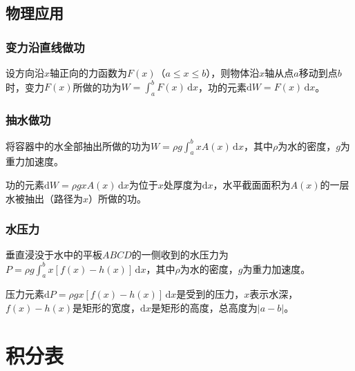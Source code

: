 \documentclass[UTF8, 12pt]{ctexart}
\begin{document}
\subsection{物理应用}

\subsubsection{变力沿直线做功}

设方向沿$x$轴正向的力函数为$F(x)$（$a\leqslant x\leqslant b$），则物体沿$x$轴从点$a$移动到点$b$时，变力$F(x)$所做的功为$W=\int_a^bF(x)\,\textrm{d}x$，功的元素$\textrm{d}W=F(x)\,\textrm{d}x$。

\subsubsection{抽水做功}

将容器中的水全部抽出所做的功为$W=\rho g\int_a^bxA(x)\,\textrm{d}x$，其中$\rho$为水的密度，$g$为重力加速度。

功的元素$\textrm{d}W=\rho gxA(x)\,\textrm{d}x$为位于$x$处厚度为$\textrm{d}x$，水平截面面积为$A(x)$的一层水被抽出（路径为$x$）所做的功。

\subsubsection{水压力}

垂直浸没于水中的平板$ABCD$的一侧收到的水压力为$P=\rho g\int_a^bx[f(x)-h(x)]\,\textrm{d}x$，其中$\rho$为水的密度，$g$为重力加速度。

压力元素$\textrm{d}P=\rho gx[f(x)-h(x)]\,\textrm{d}x$是受到的压力，$x$表示水深，$f(x)-h(x)$是矩形的宽度，$\textrm{d}x$是矩形的高度，总高度为$\vert a-b\vert$。

\section{积分表}
\end{document}
